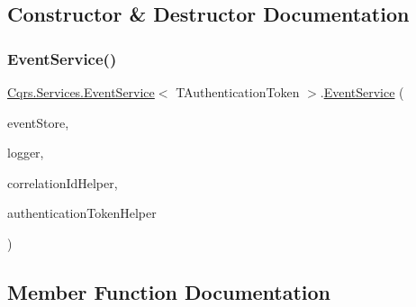 \subsection{Constructor \& Destructor Documentation}
\mbox{\label{classCqrs_1_1Services_1_1EventService_ac5896c2eb4efbdb42b3cad774b688e45}} 
\subsubsection{\texorpdfstring{Event\+Service()}{EventService()}}
{\footnotesize\ttfamily \hyperlink{classCqrs_1_1Services_1_1EventService}{Cqrs.\+Services.\+Event\+Service}$<$ T\+Authentication\+Token $>$.\hyperlink{classCqrs_1_1Services_1_1EventService}{Event\+Service} (\begin{DoxyParamCaption}\item[{\hyperlink{interfaceCqrs_1_1Events_1_1IEventStore}{I\+Event\+Store}$<$ T\+Authentication\+Token $>$}]{event\+Store,  }\item[{I\+Logger}]{logger,  }\item[{I\+Correlation\+Id\+Helper}]{correlation\+Id\+Helper,  }\item[{\hyperlink{interfaceCqrs_1_1Authentication_1_1IAuthenticationTokenHelper}{I\+Authentication\+Token\+Helper}$<$ T\+Authentication\+Token $>$}]{authentication\+Token\+Helper }\end{DoxyParamCaption})\hspace{0.3cm}{\ttfamily [protected]}}



\subsection{Member Function Documentation}
\mbox{\label{classCqrs_1_1Services_1_1EventService_a9a68d774ac754e39be56d3e0449f14d7}} 
